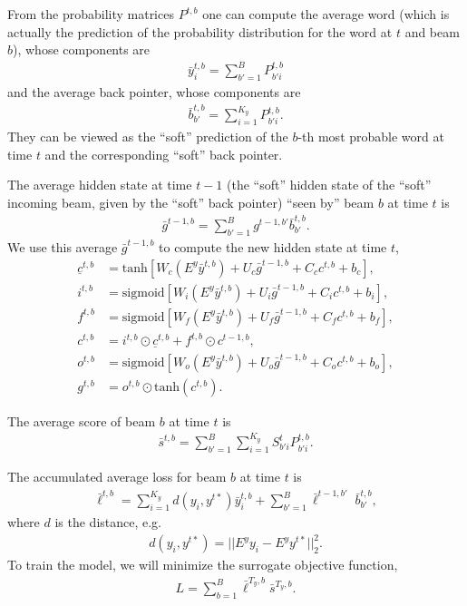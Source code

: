 \documentclass{article}
\begin{document}
	From the probability matrices $P^{t, b}$ one can compute the average word (which is actually the prediction of the probability distribution for the word at $t$ and beam $b$), whose components are
		\begin{align}
			\bar{y}^{t, b}_i = \sum_{b'=1}^B P^{t, b}_{b' i}
		\end{align}
		and the average back pointer, whose components are
		\begin{align}
			\bar{b}^{t, b}_{b'} = \sum_{i=1}^{K_y} P^{t, b}_{b' i}.
		\end{align}
		They can be viewed as the ``soft'' prediction of the $b$-th most probable word at time $t$ and the corresponding ``soft'' back pointer.

	The average hidden state at time $t-1$ (the ``soft'' hidden state of the ``soft'' incoming beam, given by the ``soft'' back pointer) ``seen by'' beam $b$ at time $t$ is
		\begin{align}
			\bar{g}^{t-1, b} = \sum_{b'=1}^B g^{t-1, b'} \bar{b}^{t, b}_{b'}.
		\end{align}
		We use this average $\bar{g}^{t-1, b}$ to compute the new hidden state at time $t$,
		\begin{align}
			\underline{c}^{t, b} &= \textrm{tanh}\left[ W_c (E^y \bar{y}^{t, b}) + U_c \bar{g}^{t-1, b} + C_c c^{t, b} + b_c \right], \\
			i^{t, b} &= \textrm{sigmoid}\left[ W_i (E^y \bar{y}^{t, b}) + U_i \bar{g}^{t-1, b} + C_i c^{t, b} + b_i \right], \\
			f^{t, b} &= \textrm{sigmoid}\left[ W_f (E^y \bar{y}^{t, b}) + U_f \bar{g}^{t-1, b} + C_f c^{t, b} + b_f \right], \\
			c^{t, b} &= i^{t, b} \odot \underline{c}^{t, b} + f^{t, b} \odot c^{t-1, b}, \\
			o^{t, b} &= \textrm{sigmoid}\left[ W_o (E^y \bar{y}^{t, b}) + U_o \bar{g}^{t-1, b} + C_o c^{t, b} + b_o \right], \\
			g^{t, b} &= o^{t, b} \odot \textrm{tanh}(c^{t, b}).
		\end{align}

	The average score of beam $b$ at time $t$ is
		\begin{align}
			\bar{s}^{t, b} = \sum_{b' = 1}^B \sum_{i = 1}^{K_y} S^t_{b' i} P^{t, b}_{b' i}.
		\end{align}

	The accumulated average loss for beam $b$ at time $t$ is
		\begin{align}
			\bar{\ell}^{t, b} = \sum_{i=1}^{K_y} d(y_i, y^{t*}) \bar{y}^{t, b}_i + \sum_{b'=1}^B \bar{\ell}^{t-1, b'} \; \bar{b}^{t, b}_{b'},
		\end{align}
		where $d$ is the distance, e.g.
		\begin{align}
			d(y_i, y^{t*}) = || E^y y_i - E^y y^{t*} ||_2^2.
		\end{align}
		To train the model, we will minimize the surrogate objective function,
		\begin{align}
			L = \sum_{b=1}^B \bar{\ell}^{T_y, b} \bar{s}^{T_y, b}.
		\end{align}
\end{document}
